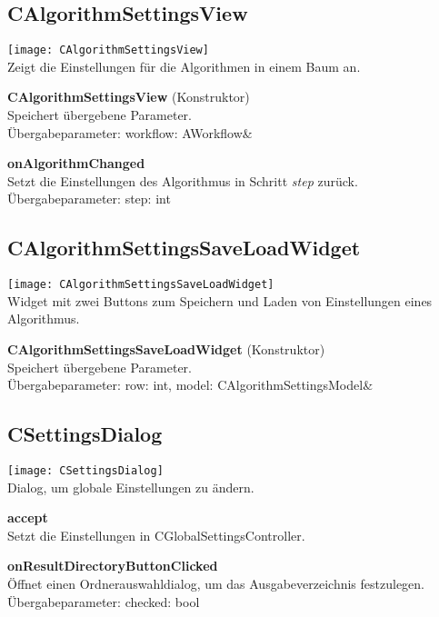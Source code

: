 \subsection{CAlgorithmSettingsView}
\texttt{[image: CAlgorithmSettingsView]}\\
Zeigt die Einstellungen für die Algorithmen in einem Baum an.
\beginMembers
\item \textbf{CAlgorithmSettingsView} (Konstruktor) \\ Speichert übergebene Parameter. \\Übergabeparameter: workflow: AWorkflow\&
\closeMembers
\newpage
\beginSlots
\item \textbf{onAlgorithmChanged} \\Setzt die Einstellungen des Algorithmus in Schritt \textit{step} zurück. \\Übergabeparameter: step: int
\closeMembers

\subsection{CAlgorithmSettingsSaveLoadWidget}
\texttt{[image: CAlgorithmSettingsSaveLoadWidget]}\\
Widget mit zwei Buttons zum Speichern und Laden von Einstellungen eines Algorithmus.
\beginMembers
\item \textbf{CAlgorithmSettingsSaveLoadWidget} (Konstruktor) \\ Speichert übergebene Parameter. \\Übergabeparameter: row: int, model: CAlgorithmSettingsModel\&
\closeMembers

\subsection{CSettingsDialog}
\texttt{[image: CSettingsDialog]}\\
Dialog, um globale Einstellungen zu ändern.
\beginSlots
\item \textbf{accept} \\Setzt die Einstellungen in CGlobalSettingsController.
\item \textbf{onResultDirectoryButtonClicked} \\Öffnet einen Ordnerauswahldialog, um das Ausgabeverzeichnis festzulegen. \\Übergabeparameter: checked: bool
\closeMembers

